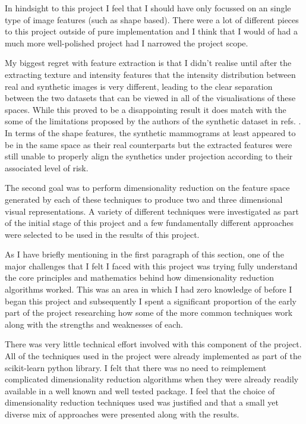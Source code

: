 In hindsight to this project I feel that I should have only focussed on an single type of image features (such as shape based). There were a lot of different pieces to this project outside of pure implementation and I think that I would of had a much more well-polished project had I narrowed the project scope.

My biggest regret with feature extraction is that I didn't realise until after the extracting texture and intensity features that the intensity distribution between real and synthetic images is very different, leading to the clear separation between the two datasets that can be viewed in all of the visualisations of these spaces. While this proved to be a disappointing result it does match with the some of the limitations proposed by the authors of the synthetic dataset in refs. \cite{bakic2002mammogram1, bakic2002mammogram2, bakic2003mammogram3}. In terms of the shape features, the synthetic mammograms at least appeared to be in the same space as their real counterparts but the extracted features were still unable to properly align the synthetics under projection according to their associated level of risk.

The second goal was to perform dimensionality reduction on the feature space generated by each of these techniques to produce two and three dimensional visual representations. A variety of different techniques were investigated as part of the initial stage of this project and a few fundamentally different approaches were selected to be used in the results of this project.

As I have briefly mentioning in the first paragraph of this section, one of the major challenges that I felt I faced with this project was trying fully understand the core principles and mathematics behind how dimensionality reduction algorithms worked. This was an area in which I had zero knowledge of before I began this project and subsequently I spent a significant proportion of the early part of the project researching how some of the more common techniques work along with the strengths and weaknesses of each. 

There was very little technical effort involved with this component of the project. All of the techniques used in the project were already implemented as part of the scikit-learn python library. I felt that there was no need to reimplement complicated dimensionality reduction algorithms when they were already readily available in a well known and well tested package. I feel that the choice of dimensionality reduction techniques used was justified and that a small yet diverse mix of approaches were presented along with the results.

